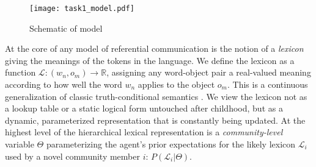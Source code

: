 \begin{figure}
\centering
    \texttt{[image: task1\_model.pdf]}
  \caption{Schematic of model}
  \label{fig:task1model}
\end{figure}
At the core of any model of referential communication is the notion of a \emph{lexicon} giving the meanings of the tokens in the language. 
We define the lexicon as a function $\mathcal{L}: (w_n, o_m) \rightarrow \mathbb{R}$, assigning any word-object pair a real-valued meaning according to how well the word $w_n$ applies to the object $o_m$. 
This is a continuous generalization of classic truth-conditional semantics . 
We view the lexicon not as a lookup table or a static logical form untouched after childhood, but as a dynamic, parameterized representation that is constantly being updated.
At the highest level of the hierarchical lexical representation is a \emph{community-level} variable $\Theta$ parameterizing the agent's prior expectations for the likely lexicon $\mathcal{L}_i$ used by a novel community member $i$: $P(\mathcal{L}_i | \Theta)$. 
